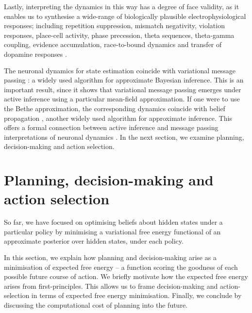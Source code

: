 \documentclass[review,12pt,authoryear]{elsarticle}
\begin{document}
Lastly, interpreting the dynamics in this way has a degree of face validity, as it enables us to synthesise a wide-range of biologically plausible electrophysiological responses; including repetition suppression, mismatch negativity, violation responses, place-cell activity, phase precession, theta sequences, theta-gamma coupling, evidence accumulation, race-to-bound dynamics and transfer of dopamine responses \citep{schwartenbeckDopaminergicMidbrainEncodes2015,fristonActiveInferenceProcess2017}.

The neuronal dynamics for state estimation coincide with variational message passing \citep{winnVariationalMessagePassing2005,dauwelsVariationalMessagePassing2007}: a widely used algorithm for approximate Bayesian inference. This is an important result, since it shows that variational message passing emerges under active inference using a particular mean-field approximation. If one were to use the Bethe approximation, the corresponding dynamics coincide with belief propagation \citep{bishopPatternRecognitionMachine2006,loeligerIntroductionFactorGraphs2004,parrNeuronalMessagePassing2019,schwobelActiveInferenceBelief2018,yedidiaConstructingFreeEnergyApproximations2005}, another widely used algorithm for approximate inference. This offers a formal connection between active inference and message passing interpretations of neuronal dynamics \citep{fristonGraphicalBrainBelief2017,dauwelsMeasuringNeuralSynchrony2007,georgeBeliefPropagationWiring2005}. In the next section, we examine planning, decision-making and action selection.


\section{Planning, decision-making and action selection}

So far, we have focused on optimising beliefs about hidden states under a particular policy by minimising a variational free energy functional of an approximate posterior over hidden states, under each policy.

In this section, we explain how planning and decision-making arise as a minimisation of expected free energy -- a function scoring the goodness of each possible future course of action. We briefly motivate how the expected free energy arises from first-principles. This allows us to frame decision-making and action-selection in terms of expected free energy minimisation. Finally, we conclude by discussing the computational cost of planning into the future.
\end{document}
